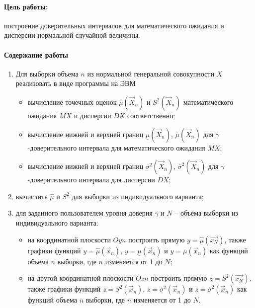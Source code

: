 \documentclass[a4paper,oneside,12pt]{extreport}
\begin{document}


\paragraph{Цель работы:} построение доверительных интервалов для математического ожидания и дисперсии нормальной случайной величины.

\paragraph{Содержание работы}

\begin{enumerate}
	\item Для выборки объема $n$ из нормальной генеральной совокупности $X$ реализовать в виде программы на ЭВМ
	\begin{itemize}
		\item вычисление точечных оценок $\hat\mu(\vec X_n)$ и $S^2(\vec X_n)$ математического ожидания $MX$ и дисперсии $DX$ соответственно;
		\item вычисление нижней и верхней границ $\underline\mu(\vec X_n)$, $\overline\mu(\vec X_n)$ для $\gamma$-доверительного интервала для математического ожидания $MX$;
		\item вычисление нижней и верхней границ $\underline\sigma^2(\vec X_n)$, $\overline\sigma^2(\vec X_n)$ для $\gamma$-доверительного интервала для дисперсии $DX$;
	\end{itemize}
	\item вычислить $\hat\mu$ и $S^2$ для выборки из индивидуального варианта;
	\item для заданного пользователем уровня доверия $\gamma$ и $N$ – объёма выборки из индивидуального варианта:
	\begin{itemize}
		\item на координатной плоскости $Oyn$ построить прямую $y = \hat\mu(\vec{x_N})$, также графики функций $y = \hat\mu(\vec x_n)$, $y = \underline\mu(\vec x_n)$ и $y = \overline\mu(\vec x_n)$ как функций объема $n$ выборки, где $n$ изменяется от 1 до $N$;
		\item на другой координатной плоскости $Ozn$ построить прямую $z = S^2(\vec{x_N})$, также графики функций $z = S^2(\vec x_n)$, $z = \underline\sigma^2(\vec x_n)$ и $z = \overline\sigma^2(\vec x_n)$ как функций объема $n$ выборки, где $n$ изменяется от 1 до $N$.
	\end{itemize}
\end{enumerate}
\end{document}
